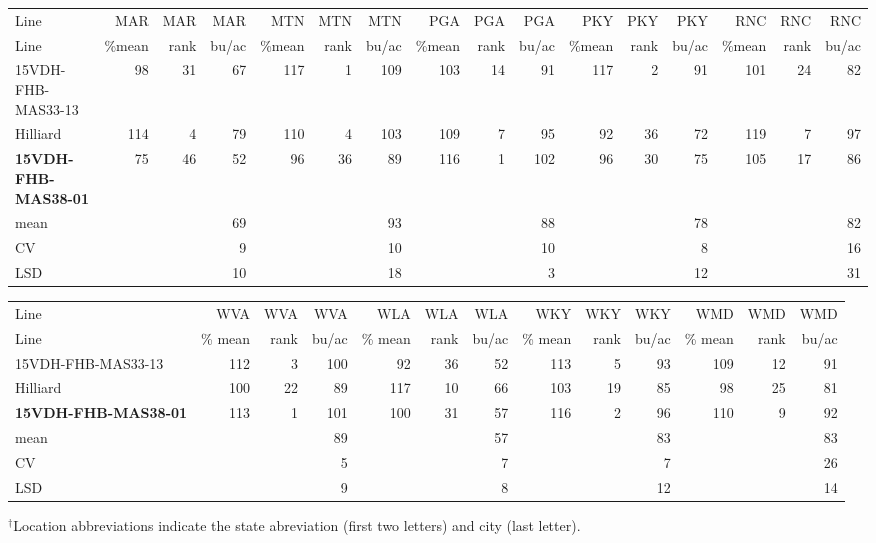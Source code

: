 \documentclass[12pt, letterpaper]{article}
\begin{document}
\begin{landscape}
\begin{table}
\bigskip

\begin{tabular}{|l|rrr|rrr|rrr|rrr|rrr|}
  \hline
Line & MAR & MAR & MAR & MTN & MTN & MTN & PGA & PGA & PGA & PKY & PKY & PKY & RNC & RNC & RNC \\ 
Line & \%mean & rank & bu/ac & \%mean & rank & bu/ac & \%mean & rank & bu/ac & \%mean & rank & bu/ac & \%mean & rank & bu/ac \\ 
  \hline
15VDH-FHB-MAS33-13 &  98 &  31 &  67 & 117 &   1 & 109 & 103 &  14 &  91 & 117 &   2 &  91 & 101 &  24 &  82 \\ 
  Hilliard & 114 &   4 &  79 & 110 &   4 & 103 & 109 &   7 &  95 &  92 &  36 &  72 & 119 &   7 &  97 \\ 
  \textbf{15VDH-FHB-MAS38-01} &  75 &  46 &  52 &  96 &  36 &  89 & 116 &   1 & 102 &  96 &  30 &  75 & 105 &  17 &  86 \\ 
  mean &  &  &  69 &  &  &  93 &  &  &  88 &  &  &  78 &  &  &  82 \\ 
  CV &  &  &   9 &  &  &  10 &  &  &  10 &  &  &   8 &  &  &  16 \\ 
  LSD &  &  &  10 &  &  &  18 &  &  &   3 &  &  &  12 &  &  &  31 \\ 
   \hline
\end{tabular}

\bigskip

\begin{tabular}{|l|rrr|rrr|rrr|rrr|}
  \hline
Line & WVA & WVA & WVA & WLA & WLA & WLA & WKY & WKY & WKY & WMD & WMD & WMD \\ 
Line & \% mean & rank & bu/ac & \% mean & rank & bu/ac & \% mean & rank & bu/ac & \% mean & rank & bu/ac \\ 
  \hline
15VDH-FHB-MAS33-13 & 112 &   3 & 100 &  92 &  36 &  52 & 113 &   5 &  93 & 109 &  12 &  91 \\ 
  Hilliard & 100 &  22 &  89 & 117 &  10 &  66 & 103 &  19 &  85 &  98 &  25 &  81 \\ 
  \textbf{15VDH-FHB-MAS38-01} & 113 &   1 & 101 & 100 &  31 &  57 & 116 &   2 &  96 & 110 &   9 &  92 \\ 
  mean &  &  &  89 &  &  &  57 &  &  &  83 &  &  &  83 \\ 
  CV &  &  &   5 &  &  &   7 &  &  &   7 &  &  &  26 \\ 
  LSD &  &  &   9 &  &  &   8 &  &  &  12 &  &  &  14 \\ 
   \hline
\end{tabular}

\raggedright{
\footnotesize
$^\dagger$Location abbreviations indicate the state abreviation (first two letters) and city (last letter).}
\end{table}


\end{landscape}
\end{document}
